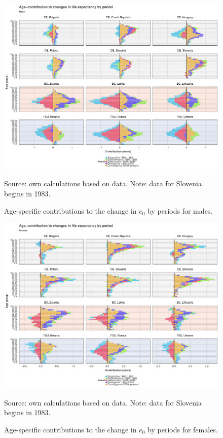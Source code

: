 \documentclass{article}
\begin{document}
\begin{figure}[h!]
\caption{Age-specific contributions to the change in $e_0$ by periods for males.}
\centering
\begin{center}
\includegraphics[scale=.5]{Figures/Age_e0_decomp_Males.pdf}
\end{center}
Source: own calculations based on \citet{HMD} data. Note: data for Slovenia begins in 1983.
\end{figure}

\newpage

\begin{figure}[h!]
\caption{Age-specific contributions to the change in $e_0$ by periods for females.}
\centering
\begin{center}
\includegraphics[scale=.5]{Figures/Age_e0_decomp_Females.pdf}
\end{center}
Source: own calculations based on \citet{HMD} data. Note: data for Slovenia begins in 1983.
\end{figure}
\end{document}
